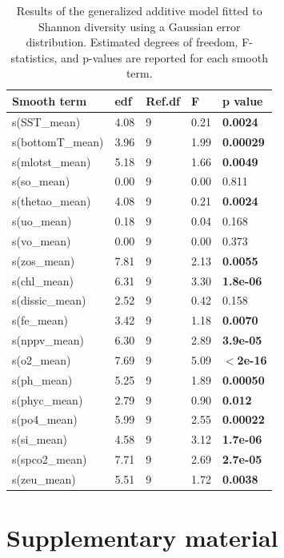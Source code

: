 \documentclass[a4paper,fleqn]{cas-sc}
\begin{document}
\begin{table}[width=\linewidth,cols=5,pos=h]
\caption{Results of the generalized additive model fitted to Shannon diversity using a Gaussian error distribution. Estimated degrees of freedom, F-statistics, and p-values are reported for each smooth term.}
\begin{tabular*}{\tblwidth}{@{} LLLLL @{}}
\toprule
\textbf{Smooth term} & \textbf{edf} & \textbf{Ref.df} & \textbf{F} & \textbf{p value} \\
\midrule
s(SST\_mean)      & 4.08 & 9 & 0.21 & \textbf{0.0024} \\
s(bottomT\_mean) & 3.96 & 9 & 1.99 & \textbf{0.00029} \\
s(mlotst\_mean)   & 5.18 & 9 & 1.66 & \textbf{0.0049} \\
s(so\_mean)       & 0.00 & 9 & 0.00 & 0.811 \\
s(thetao\_mean)   & 4.08 & 9 & 0.21 & \textbf{0.0024} \\
s(uo\_mean)       & 0.18 & 9 & 0.04 & 0.168 \\
s(vo\_mean)       & 0.00 & 9 & 0.00 & 0.373 \\
s(zos\_mean)      & 7.81 & 9 & 2.13 & \textbf{0.0055} \\
s(chl\_mean)      & 6.31 & 9 & 3.30 & \textbf{1.8e-06} \\
s(dissic\_mean)   & 2.52 & 9 & 0.42 & 0.158 \\
s(fe\_mean)       & 3.42 & 9 & 1.18 & \textbf{0.0070} \\
s(nppv\_mean)     & 6.30 & 9 & 2.89 & \textbf{3.9e-05} \\
s(o2\_mean)       & 7.69 & 9 & 5.09 & \textbf{$<$2e-16} \\
s(ph\_mean)       & 5.25 & 9 & 1.89 & \textbf{0.00050} \\
s(phyc\_mean)     & 2.79 & 9 & 0.90 & \textbf{0.012} \\
s(po4\_mean)      & 5.99 & 9 & 2.55 & \textbf{0.00022} \\
s(si\_mean)       & 4.58 & 9 & 3.12 & \textbf{1.7e-06} \\
s(spco2\_mean)    & 7.71 & 9 & 2.69 & \textbf{2.7e-05} \\
s(zeu\_mean)      & 5.51 & 9 & 1.72 & \textbf{0.0038} \\
\bottomrule
\end{tabular*}
\label{tab:9}
\end{table}
\FloatBarrier


\section{Supplementary material}
\end{document}
